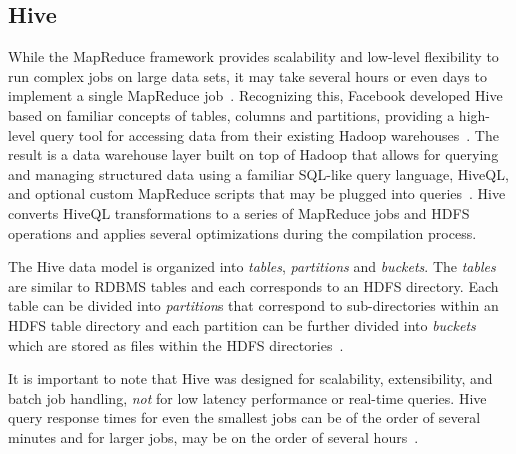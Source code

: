 \subsection{Hive}
While the MapReduce framework provides scalability and low-level flexibility to run complex jobs on large data sets, it may take several hours or even days to implement a single MapReduce job~\cite{thusoo}. Recognizing this, Facebook developed Hive based on familiar concepts of tables, columns and partitions, providing a high-level query tool for accessing data from their existing Hadoop warehouses~\cite{thusoo}.  The result is a data warehouse layer built on top of Hadoop that allows for querying and managing structured data using a familiar SQL-like query language, HiveQL, and optional custom MapReduce scripts that may be plugged into queries~\cite{hive,thusoo2}. Hive converts HiveQL transformations to a series of MapReduce jobs and HDFS operations and applies several optimizations during the compilation process. 

The Hive data model is organized into \textit{tables}, \textit{partitions} and \textit{buckets}. The \textit{tables} are similar to RDBMS tables and each corresponds to an HDFS directory. Each table can be divided into \textit{partition}s that correspond to sub-directories within an HDFS table directory and each partition can be further divided into \textit{buckets} which are stored as files within the HDFS directories~\cite{thusoo2}. 

It is important to note that Hive was designed for scalability, extensibility, and batch job handling, \textit{not} for low latency performance or real-time queries. Hive query response times for even the smallest jobs can be of the order of several minutes and for larger jobs, may be on the order of several hours~\cite{hive}.